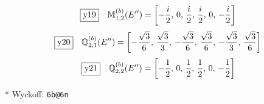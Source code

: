 \documentclass[fleqn,10pt,landscape]{jsarticle}
\begin{document}
\begin{dmath*}
\fbox{y19}\quad \mathbb{M}_{1,2}^{(b)}(E^{\prime\prime})=\left[ - \frac{i}{2},\, 0,\, \frac{i}{2},\, \frac{i}{2},\, 0,\, - \frac{i}{2} \right]
\end{dmath*}
\begin{dmath*}
\fbox{y20}\quad \mathbb{Q}_{2,1}^{(b)}(E^{\prime\prime})=\left[ - \frac{\sqrt{3}}{6},\, \frac{\sqrt{3}}{3},\, - \frac{\sqrt{3}}{6},\, \frac{\sqrt{3}}{6},\, - \frac{\sqrt{3}}{3},\, \frac{\sqrt{3}}{6} \right]
\end{dmath*}
\begin{dmath*}
\fbox{y21}\quad \mathbb{Q}_{2,2}^{(b)}(E^{\prime\prime})=\left[ - \frac{1}{2},\, 0,\, \frac{1}{2},\, \frac{1}{2},\, 0,\, - \frac{1}{2} \right]
\end{dmath*}
\vspace{5mm}

\noindent ** Wyckoff: \texttt{6b@6n}
\end{document}
